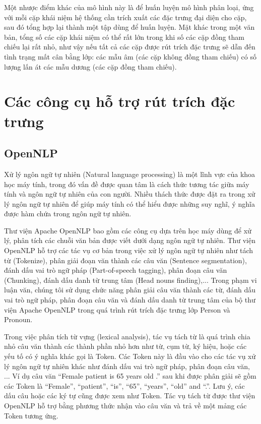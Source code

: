 Một nhược điểm khác của mô hình này là để huấn luyện mô hình phân loại, ứng với mỗi cặp khái niệm hệ thống cần trích xuất các đặc trưng đại diện cho cặp, sau đó tổng hợp lại thành một tập dùng để huấn luyện. Mặt khác trong một văn bản, tổng số các cặp khái niệm có thể rất lớn trong khi số các cặp đồng tham chiếu lại rất nhỏ, như vậy nếu tất cả các cặp được rút trích đặc trưng sẽ dẫn đến tình trạng mất cân bằng lớp: các mẫu âm (các cặp không đồng tham chiếu) có số lượng lấn át các mẫu dương (các cặp đồng tham chiếu).



\section{Các công cụ hỗ trợ rút trích đặc trưng} \label{tools}

\subsection*{OpenNLP}
Xử lý ngôn ngữ tự nhiên (Natural language processing) là một lĩnh vực của khoa học máy tính, trong đó vấn đề được quan tâm là cách thức tương tác giữa máy tính và ngôn ngữ tự nhiên của con người. Nhiều thách thức được đặt ra trong xử lý ngôn ngữ tự nhiên để giúp máy tính có thể hiểu được những suy nghĩ, ý nghĩa được hàm chứa trong ngôn ngữ tự nhiên.

Thư viện Apache OpenNLP bao gồm các công cụ dựa trên học máy dùng để xử lý, phân tích các chuỗi văn bản được viết dưới dạng ngôn ngữ tự nhiên. Thư viện OpenNLP hỗ trợ các tác vụ cơ bản trong việc xử lý ngôn ngữ tự nhiên như tách từ (Tokenize), phân giải đoạn văn thành các câu văn (Sentence segmentation), đánh dấu vai trò ngữ pháp (Part-of-speech tagging), phân đoạn câu văn (Chunking), đánh dấu danh từ trung tâm (Head nouns finding),... Trong phạm vi luận văn, chúng tôi sử dụng chức năng phân giải câu văn thành các từ, đánh dấu vai trò ngữ pháp, phân đoạn câu văn và đánh dấu danh từ trung tâm của bộ thư viện Apache OpenNLP trong quá trình rút trích đặc trưng lớp Person và Pronoun.

Trong việc phân tích từ vựng (lexical analysis), tác vụ tách từ là quá trình chia nhỏ câu văn thành các thành phần nhỏ hơn như từ, cụm từ, ký hiệu, hoặc các yếu tố có ý nghĩa khác gọi là Token. Các Token này là đầu vào cho các tác vụ xử lý ngôn ngữ tự nhiên khác như đánh dấu vai trò ngữ pháp, phân đoạn câu văn, ... Ví dụ câu văn ``Female patient is 65 years old .'' sau khi được phân giải sẽ gồm các Token là ``Female'', ``patient'', ``is'', ``65'', ``years'', ``old'' and ``.''. Lưu ý, các dấu câu hoặc các ký tự cũng được xem như Token. Tác vụ tách từ được thư viện OpenNLP hỗ trợ bằng phương thức nhận vào câu văn và trả về một mảng các Token tương ứng.

